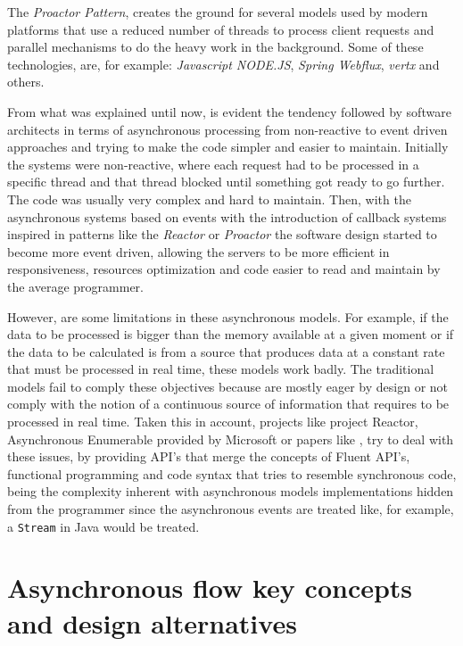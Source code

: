 The \textit{Proactor Pattern}, creates the ground for several models used by modern platforms that use a reduced number of threads to process client requests and parallel mechanisms to do the heavy work in the background. Some of these technologies, are, for example: \textit{Javascript NODE.JS}, \textit{Spring Webflux}, \textit{vertx} and others.

From what was explained until now, is evident the tendency followed by software architects in terms of asynchronous processing from non-reactive to event driven approaches and trying to make the code simpler and easier to maintain. Initially the systems were non-reactive, where each request had to be processed in a 
specific thread and that thread blocked until something got ready to go further. The code was usually very complex and hard to maintain. 
Then, with the asynchronous systems based on events with the introduction of callback systems inspired in patterns like the \textit{Reactor} or \textit{Proactor} the software design started to become more event driven, allowing the servers to be more efficient in responsiveness, resources optimization and code easier to read and maintain by the average programmer.

However, are some limitations in these asynchronous models. For example, if the data to be processed is bigger than the memory available at a given moment or if the data to be calculated is from a source that produces data at a constant rate that must be processed in real time, these models work badly.  
The traditional models fail to comply these objectives because are mostly eager by design or not comply with the notion of a continuous source of information that requires to be processed in real time.
Taken this in account, projects like project Reactor, Asynchronous Enumerable provided by Microsoft or papers like \cite{LAZYVSEAGER}, try to deal with these issues, by providing API's that merge the concepts of Fluent API's, functional programming and code syntax that tries to resemble synchronous code, being the complexity inherent with asynchronous models implementations hidden from the programmer since the asynchronous events are treated like, for example, a \texttt{Stream} in Java would be treated.

\clearpage
\section{Asynchronous flow key concepts and design alternatives} %
\label{sec:async_concepts}

